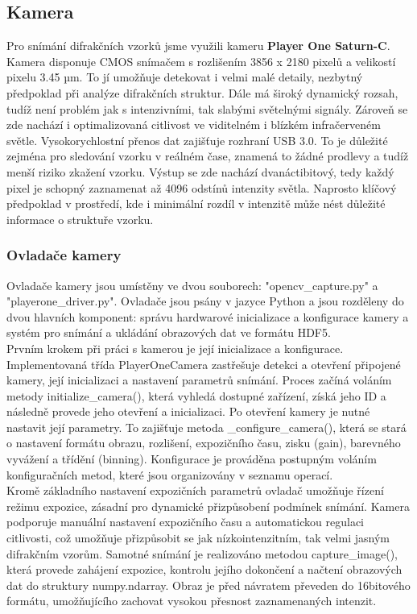 \documentclass{article}
\begin{document}
\subsection{Kamera}
Pro snímání difrakčních vzorků jsme využili kameru \textbf{Player One Saturn-C}. Kamera disponuje CMOS snímačem s rozlišením 3856 x 2180 pixelů a velikostí pixelu 3.45 µm. To jí umožňuje detekovat i velmi malé detaily, nezbytný předpoklad při analýze difrakčních struktur.
    Dále má široký dynamický rozsah, tudíž není problém jak s intenzivními, tak slabými světelnými signály. Zároveň se zde nachází i optimalizovaná citlivost ve viditelném i blízkém infračerveném světle.
    Vysokorychlostní přenos dat zajišťuje rozhraní USB 3.0. To je důležité zejména pro sledování vzorku v reálném čase, znamená to žádné prodlevy a tudíž menší riziko zkažení vzorku.
    Výstup se zde nachází dvanáctibitový, tedy každý pixel je schopný zaznamenat až 4096 odstínů intenzity světla. Naprosto klíčový předpoklad v prostředí, kde i minimální rozdíl v intenzitě může nést důležité informace o struktuře vzorku.

\subsubsection{Ovladače kamery}
 Ovladače kamery jsou umístěny ve dvou souborech: "opencv\_capture.py" a "playerone\_driver.py". Ovladače jsou psány v jazyce Python a jsou rozděleny do dvou hlavních komponent: správu hardwarové inicializace a konfigurace kamery a systém pro snímání a ukládání obrazových dat ve formátu HDF5.\\

    Prvním krokem při práci s kamerou je její inicializace a konfigurace. Implementovaná třída PlayerOneCamera zastřešuje detekci a otevření připojené kamery, její inicializaci a nastavení parametrů snímání. Proces začíná voláním metody initialize\_camera(), která vyhledá dostupné zařízení, získá jeho ID a následně provede jeho otevření a inicializaci. Po otevření kamery je nutné nastavit její parametry. To zajišťuje metoda \_configure\_camera(), která se stará o nastavení formátu obrazu, rozlišení, expozičního času, zisku (gain), barevného vyvážení a třídění (binning). Konfigurace je prováděna postupným voláním konfiguračních metod, které jsou organizovány v seznamu operací.\\

    Kromě základního nastavení expozičních parametrů ovladač umožňuje řízení režimu expozice, zásadní pro dynamické přizpůsobení podmínek snímání. Kamera podporuje manuální nastavení expozičního času a automatickou regulaci citlivosti, což umožňuje přizpůsobit se jak nízkointenzitním, tak velmi jasným difrakčním vzorům. Samotné snímání je realizováno metodou capture\_image(), která provede zahájení expozice, kontrolu jejího dokončení a načtení obrazových dat do struktury numpy.ndarray. Obraz je před návratem převeden do 16bitového formátu, umožňujícího zachovat vysokou přesnost zaznamenaných intenzit.\\
\end{document}
